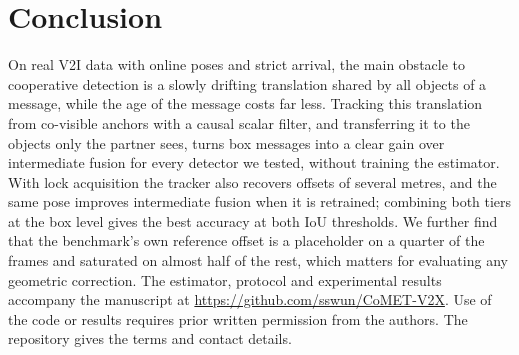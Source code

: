\section{Conclusion}
\label{sec:conclusion}
On real V2I data with online poses and strict arrival, the main obstacle to cooperative detection is a slowly drifting translation shared by all objects of a message, while the age of the message costs far less.
Tracking this translation from co-visible anchors with a causal scalar filter, and transferring it to the objects only the partner sees, turns box messages into a clear gain over intermediate fusion for every detector we tested, without training the estimator.
With lock acquisition the tracker also recovers offsets of several metres, and the same pose improves intermediate fusion when it is retrained; combining both tiers at the box level gives the best accuracy at both IoU thresholds.
We further find that the benchmark's own reference offset is a placeholder on a quarter of the frames and saturated on almost half of the rest, which matters for evaluating any geometric correction.
The estimator, protocol and experimental results accompany the manuscript at
\url{https://github.com/sswun/CoMET-V2X}. Use of the code or results requires
prior written permission from the authors. The repository gives the terms and contact details.
